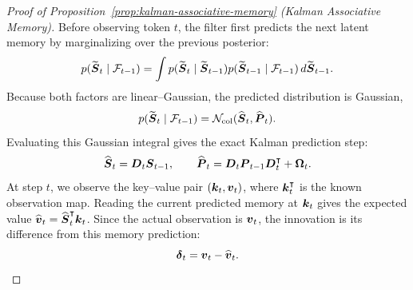 \documentclass[11pt,letterpaper,logo]{yalearxiv}
\begin{document}
\begin{proof}[Proof of Proposition~\ref{prop:kalman-associative-memory} (Kalman Associative Memory)]
Before observing token $t$, the filter first predicts the next latent memory by marginalizing
over the previous posterior:
\begin{equation}
  p(\widetilde{\boldsymbol{S}}_t\mid \mathcal F_{t-1})
  =
  \int
  p(\widetilde{\boldsymbol{S}}_t\mid \widetilde{\boldsymbol{S}}_{t-1})
  p(\widetilde{\boldsymbol{S}}_{t-1}\mid \mathcal F_{t-1})
  \,d\widetilde{\boldsymbol{S}}_{t-1} .
  \label{eq:prediction-integral}
\end{equation}
Because both factors are linear--Gaussian, the predicted distribution is Gaussian,
\begin{equation}
  p(\widetilde{\boldsymbol{S}}_t\mid \mathcal F_{t-1})
  =
  \mathcal N_{\mathrm{col}}(\widehat{\boldsymbol{S}}_t,\widehat{\boldsymbol{P}}_t).
  \label{eq:predicted-prior}
\end{equation}
Evaluating this Gaussian integral gives the exact Kalman prediction step:
\begin{equation}
  \widehat{\boldsymbol{S}}_t=\boldsymbol{D}_t\boldsymbol{S}_{t-1},
  \qquad
  \widehat{\boldsymbol{P}}_t
  =
  \boldsymbol{D}_t\boldsymbol{P}_{t-1}\boldsymbol{D}_t^{\intercal}+\boldsymbol{\Omega}_t.
  \label{eq:kam-predict}
\end{equation}
At step $t$, we observe the key--value pair $(\boldsymbol{k}_t,\boldsymbol{v}_t)$, where
$\boldsymbol{k}_t^{\intercal}$ is the known observation map.
Reading the current predicted memory at $\boldsymbol{k}_t$ gives the expected value
$\widehat{\boldsymbol{v}}_t=\widehat{\boldsymbol{S}}_t^{\intercal}\boldsymbol{k}_t$. Since the actual observation is
$\boldsymbol{v}_t$, the innovation is its difference from this memory prediction:
\begin{equation}
  \boldsymbol{\delta}_t=\boldsymbol{v}_t-\widehat{\boldsymbol{v}}_t.
  \label{eq:kam-innovation}
\end{equation}


\end{proof}
\end{document}
